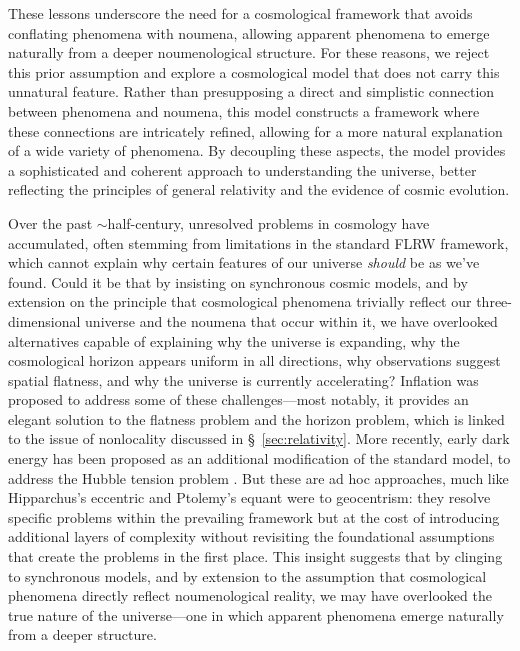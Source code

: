 \documentclass[aps,rmp,groupedaddress,twocolumn,10pt]{revtex4-2}
\begin{document}
These lessons underscore the need for a cosmological framework that avoids conflating phenomena with noumena, allowing apparent phenomena to emerge naturally from a deeper noumenological structure. For these reasons, we reject this prior assumption and explore a cosmological model that does not carry this unnatural feature. Rather than presupposing a direct and simplistic connection between phenomena and noumena, this model constructs a framework where these connections are intricately refined, allowing for a more natural explanation of a wide variety of phenomena. By decoupling these aspects, the model provides a sophisticated and coherent approach to understanding the universe, better reflecting the principles of general relativity and the evidence of cosmic evolution.

Over the past $\sim$half-century, unresolved problems in cosmology have accumulated, often stemming from limitations in the standard FLRW framework, which cannot explain why certain features of our universe \textit{should} be as we've found. Could it be that by insisting on synchronous cosmic models, and by extension on the principle that cosmological phenomena trivially reflect our three-dimensional universe and the noumena that occur within it, we have overlooked alternatives capable of explaining why the universe is expanding, why the cosmological horizon appears uniform in all directions, why observations suggest spatial flatness, and why the universe is currently accelerating? Inflation \cite{Guth1981} was proposed to address some of these challenges---most notably, it provides an elegant solution to the flatness problem and the horizon problem, which is linked to the issue of nonlocality discussed in \S~\ref{sec:relativity}. More recently, early dark energy has been proposed as an additional modification of the standard model, to address the Hubble tension problem \cite{Kamionkowski2023}. But these are ad hoc approaches, much like Hipparchus's eccentric and Ptolemy's equant were to geocentrism: they resolve specific problems within the prevailing framework but at the cost of introducing additional layers of complexity without revisiting the foundational assumptions that create the problems in the first place. This insight suggests that by clinging to synchronous models, and by extension to the assumption that cosmological phenomena directly reflect noumenological reality, we may have overlooked the true nature of the universe---one in which apparent phenomena emerge naturally from a deeper structure. 
\end{document}
